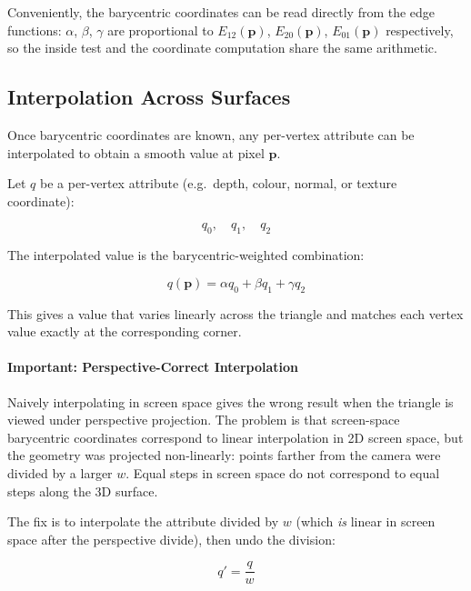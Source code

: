 \documentclass[11pt]{article}
\begin{document}
Conveniently, the barycentric coordinates can be read directly from the edge functions: $\alpha$, $\beta$, $\gamma$ are proportional to $E_{12}(\mathbf{p})$, $E_{20}(\mathbf{p})$, $E_{01}(\mathbf{p})$ respectively, so the inside test and the coordinate computation share the same arithmetic.

\subsection{Interpolation Across Surfaces}

Once barycentric coordinates are known, any per-vertex attribute can be interpolated to obtain a smooth value at pixel $\mathbf{p}$.

Let $q$ be a per-vertex attribute (e.g.\ depth, colour, normal, or texture coordinate):

\begin{equation}
    q_0, \quad q_1, \quad q_2
\end{equation}

The interpolated value is the barycentric-weighted combination:

\begin{equation}
    q(\mathbf{p}) = \alpha q_0 + \beta q_1 + \gamma q_2
\end{equation}

This gives a value that varies linearly across the triangle and matches each vertex value exactly at the corresponding corner.

\paragraph{Important: Perspective-Correct Interpolation}

Naively interpolating in screen space gives the wrong result when the triangle is viewed under perspective projection. The problem is that screen-space barycentric coordinates correspond to linear interpolation in 2D screen space, but the geometry was projected non-linearly: points farther from the camera were divided by a larger $w$. Equal steps in screen space do not correspond to equal steps along the 3D surface.

The fix is to interpolate the attribute divided by $w$ (which \emph{is} linear in screen space after the perspective divide), then undo the division:

\begin{equation}
    q' = \frac{q}{w}
\end{equation}
\end{document}
